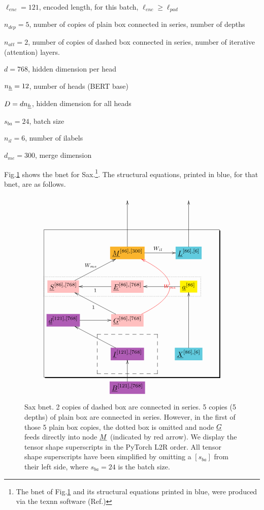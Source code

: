 $\ell_{enc}=121$, encoded length, for this batch, $\ell_{enc}\geq \ell_{pad}$

$n_{dep}=5$, number of copies of plain box connected in series, number of depths

 $n_{att}=2$, number of copies of
dashed box connected in series, number of iterative (attention) layers.


$d=768$, hidden dimension per head

$n_\rvh=12$, number of heads (BERT base)

$D=d n_\rvh$, hidden dimension
for all heads


$s_{ba}=24$, batch size

$n_{il}=6$, number of ilabels

$d_{me}=300$, merge dimension

Fig.\ref{fig-texnn-for-sentence-ax-bnet}
shows the bnet  for Sax.\footnote{The
bnet of Fig.\ref{fig-texnn-for-sentence-ax-bnet}
and its structural equations
printed in blue,
were produced via the texnn software (Ref.\cite{texnn})}. The structural equations, printed in
blue, for that bnet, are as follows.

\begin{figure}[h!]\centering
$$\xymatrix@R=2.5pc@C=3.5pc{
&&
\\
&&
\\
&*+[F*:Dandelion]{\underline{M}^{[86], [300]}}\ar[uu]\ar[r]^{W_{il}}&*+[F*:SkyBlue]{\underline{L}^{[86], [6]}}\ar[uu]
\\
*+[F*:pink]{\underline{S}^{[86], [768]}}\ar[ur]^{W_{me}}&*+[F*:pink]{\underline{E}^{[86], [768]}}\ar[l]^{1}&*+[F*:yellow]{\underline{a}^{[86]}}\ar[l]
\\
*+[F*:Orchid]{\underline{d}^{[121], [768]}}\ar[r]&*+[F*:pink]{\underline{G}^{[86], [768]}}\ar@[red]@/_5pc/[uu]|-{\color{red} W_{me}}\ar[ul]^{1}&
\\
&*+[F*:Orchid]{\underline{I}^{[121], [768]}}\ar[ul]&*+[F*:SkyBlue]{\underline{X}^{[86], [6]}}\ar[uu]
\\
&*+[F*:Orchid]{\underline{B}^{[121], [768]}}\ar[u]&
\save
\POS"3,1"."6,1"."3,3"."6,3"!C*+<4.8em>\frm{-,}
\POS"6,2"."6,2"."6,2"."6,2"!C*+<3.8em>\frm{--}
\POS"4,1"."4,1"."4,3"."4,3"!C*+<1.0em>\frm{.}
\restore
}$$
\caption{Sax bnet. 2 copies of dashed box are connected in series. 5 copies (5 depths) of plain box are connected in series.  However, in the first of those 5 plain box copies, the dotted box  is omitted and node $\ul{G}$ feeds directly into node  $\ul{M}$ (indicated by red arrow). We display the tensor shape superscripts in the PyTorch L2R order. All tensor shape superscripts have been simplified by omitting a $[s_{ba}]$ from their left side, where $s_{ba}=24$ is the batch size. }
\label{fig-texnn-for-sentence-ax-bnet}
\end{figure}

